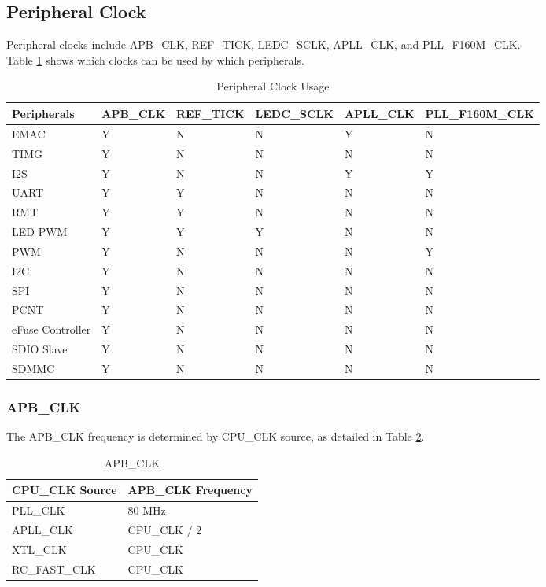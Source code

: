 \documentclass[main\_\_EN.tex]{subfiles}
\begin{document}
\subsection{Peripheral Clock}
Peripheral clocks include APB\_CLK, REF\_TICK, LEDC\_SCLK, APLL\_CLK, and PLL\_F160M\_CLK.\\
Table \ref{table:peri clk owner} shows which clocks can be used by which peripherals.
\begin{longtable}[c]{ |l|l|l|l|l|l| }
 \caption{Peripheral Clock Usage}
    \label{table:peri clk owner}
        \\\hline
        \rowcolor{lightgray}
        Peripherals & APB\_CLK & REF\_TICK & LEDC\_SCLK & APLL\_CLK & PLL\_F160M\_CLK\\
        \hline
        EMAC & Y & N & N & Y & N \\
        \hline
        TIMG & Y & N & N & N & N \\
        \hline
        I2S & Y & N & N & Y & Y \\
        \hline
        UART & Y & Y & N & N & N \\
        \hline
        RMT & Y & Y & N & N & N \\
        \hline
        LED PWM & Y & Y & Y & N & N \\
        \hline
        PWM & Y & N & N & N & Y \\
        \hline
        I2C & Y & N & N & N & N \\
        \hline
        SPI & Y & N & N & N & N \\
        \hline
        PCNT & Y & N & N & N & N \\
        \hline
        eFuse Controller & Y & N & N & N & N \\
        \hline
        SDIO Slave & Y & N & N & N & N \\
        \hline
        SDMMC & Y & N & N & N & N \\
        \hline
    \end{longtable}


\subsubsection{APB\_CLK}

The APB\_CLK frequency is determined by CPU\_CLK source, as detailed in Table \ref{table:apb_clk_src}.

\begin{longtable}[c]{|l|l|}
      \caption{APB\_CLK}
    \label{table:apb_clk_src}
        \\\hline
        \rowcolor{lightgray}
        CPU\_CLK Source & APB\_CLK Frequency\\
        \hline
        PLL\_CLK &  80 MHz \\
        \hline
        APLL\_CLK & CPU\_CLK / 2 \\
        \hline
        XTL\_CLK & CPU\_CLK \\
        \hline
        RC\_FAST\_CLK & CPU\_CLK \\
        \hline
\end{longtable}
\end{document}
